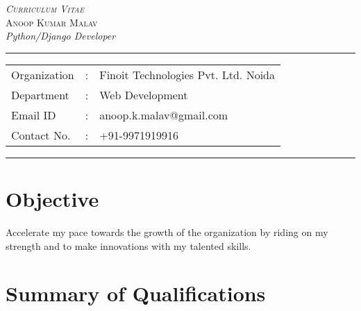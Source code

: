 \documentclass[12pt]{article}
\begin{document}
\begin{center}

\textsc{\huge \textit{Curriculum Vitae}}
\\[0.5cm]
\textsc{\Large Anoop Kumar Malav}
 \\[0.1cm]

\textit{\large Python/Django Developer} \\
\addvspace{0.04cm}
\rule[0.07cm]{17.52cm}{0.01cm}
\begin{tabular}{l c l}
Organization      &:& Finoit Technologies Pvt. Ltd. Noida \\
Department        &:& Web Development \\
Email ID          &:& anoop.k.malav@gmail.com \\
Contact No.       &:& +91-9971919916 \\
\end{tabular}

\addvspace{0.02cm}
\rule[0.02cm]{17.52cm}{0.01cm}
\end{center}

\section*{Objective}
Accelerate my pace towards the growth of the organization by riding on my strength and
to make innovations with my talented skills.

\section*{Summary of Qualifications}
\end{document}
